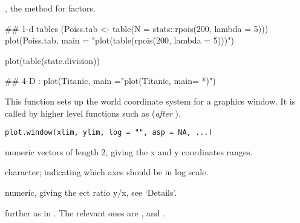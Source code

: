 %
\begin{SeeAlso}\relax
{}, the  method for factors.
\end{SeeAlso}
%
\begin{Examples}
\begin{ExampleCode}
## 1-d tables
(Poiss.tab <- table(N = stats::rpois(200, lambda = 5)))
plot(Poiss.tab, main = "plot(table(rpois(200, lambda = 5)))")

plot(table(state.division))

## 4-D :
plot(Titanic, main ="plot(Titanic, main= *)")

\end{ExampleCode}
\end{Examples}
%
\begin{Description}\relax
This function sets up the world coordinate system for a graphics
window.  It is called by higher level functions such as
 (\emph{after} ).
\end{Description}
%
\begin{Usage}
\begin{verbatim}
plot.window(xlim, ylim, log = "", asp = NA, ...)
\end{verbatim}
\end{Usage}
%
\begin{Arguments}
\begin{ldescription}
\item[\code{xlim, ylim}] numeric vectors of length 2, giving the x and y
coordinates ranges.
\item[\code{log}] character; indicating which axes should be in log scale.
\item[\code{asp}] numeric, giving the ect ratio y/x,
see `Details'.
\item[\code{...}] further  as in .
The relevant ones are ,  and .

\end{ldescription}
\end{Arguments}
%
